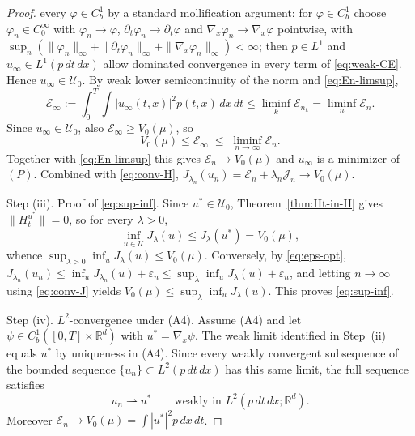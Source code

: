 \documentclass[11pt,leqno]{article}
\theoremstyle{plain}
\theoremstyle{remark}
\theoremstyle{definition}
\numberwithin{equation}{section}
\numberwithin{figure}{section}
\numberwithin{table}{section}
\begin{document}
\begin{proof}
every $\varphi\in C_b^1$ by a standard mollification argument:
for $\varphi\in C_b^1$ choose $\varphi_n\in C_0^\infty$ with
$\varphi_n\to\varphi$, $\partial_t\varphi_n\to\partial_t\varphi$ and
$\nabla_x\varphi_n\to\nabla_x\varphi$ pointwise, with
$\sup_n(\|\varphi_n\|_\infty+\|\partial_t\varphi_n\|_\infty
+\|\nabla_x\varphi_n\|_\infty)<\infty$; then $p\in L^1$ and
$u_\infty\in L^1(p\,dt\,dx)$ allow dominated convergence in every
term of \eqref{eq:weak-CE}.  Hence $u_\infty\in\mathcal{U}_0$.
By weak lower semicontinuity of the norm and \eqref{eq:En-limsup},
\[
 \mathcal{E}_\infty:=\int_0^T\int |u_\infty(t,x)|^2p(t,x)\,dx\,dt
 \le \liminf_k\mathcal{E}_{n_k}
 = \liminf_n\mathcal{E}_n.
\]
Since $u_\infty\in\mathcal{U}_0$, also $\mathcal{E}_\infty\ge V_0(\mu)$,
so
\[
 V_0(\mu) \le \mathcal{E}_\infty \;\le\; \liminf_{n\to\infty}\mathcal{E}_n.
\]
Together with \eqref{eq:En-limsup} this gives $\mathcal{E}_n\to V_0(\mu)$
and $u_\infty$ is a minimizer of $(P)$.
Combined with \eqref{eq:conv-H},
$J_{\lambda_n}(u_n)=\mathcal{E}_n+\lambda_n\mathcal{J}_n\to V_0(\mu)$.

Step (iii).  Proof of \eqref{eq:sup-inf}.  Since
$u^\ast\in\mathcal{U}_0$, Theorem~\ref{thm:Ht-in-H} gives
$\|H_t^{u^\ast}\|=0$, so for every $\lambda>0$,
\[
 \inf_{u\in\mathcal{U}}J_\lambda(u)\le J_\lambda(u^\ast) = V_0(\mu),
\]
whence $\sup_{\lambda>0}\inf_u J_\lambda(u)\le V_0(\mu)$.  Conversely,
by \eqref{eq:eps-opt},
$J_{\lambda_n}(u_n)\le \inf_u J_{\lambda_n}(u)+\varepsilon_n
\le \sup_\lambda\inf_u J_\lambda(u)+\varepsilon_n$, and letting
$n\to\infty$ using \eqref{eq:conv-J} yields
$V_0(\mu)\le\sup_\lambda\inf_u J_\lambda(u)$.  This proves
\eqref{eq:sup-inf}.


Step (iv). $L^2$-convergence under {\rm (A4)}.  Assume
(A4) and let $\psi\in C_b^1([0,T]\times\mathbb{R}^d)$ with
$u^{\ast}=\nabla_x\psi$.  The weak limit identified in Step~(ii)
equals $u^\ast$ by uniqueness in (A4). Since every weakly convergent
subsequence of the bounded sequence $\{u_n\}\subset L^2(p\,dt\,dx)$
has this same limit, the full sequence satisfies
\begin{equation}\label{eq:un-weak}
 u_n\rightharpoonup u^\ast\qquad\text{weakly in }L^2(p\,dt\,dx;\mathbb{R}^d).
\end{equation}
Moreover $\mathcal{E}_n\to V_0(\mu)=\int|u^\ast|^2p\,dx\,dt$.


\end{proof}
\end{document}
